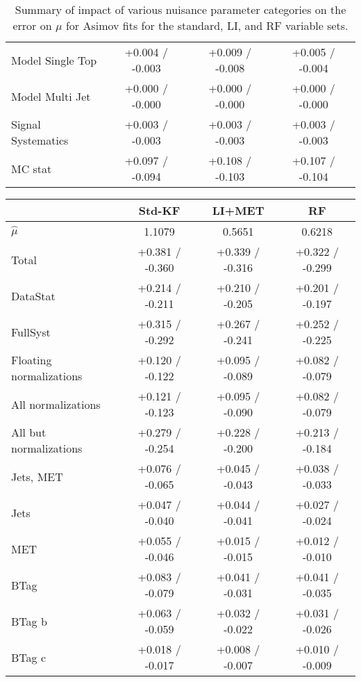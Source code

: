 \begin{table}[!htbp]
\begin{center}
\begin{tabular}{lccc}
Model Single Top &  +0.004 / -0.003  &  +0.009 / -0.008  &  +0.005 / -0.004 \\
Model Multi Jet &  +0.000 / -0.000  &  +0.000 / -0.000  &  +0.000 / -0.000 \\
Signal Systematics &  +0.003 / -0.003  &  +0.003 / -0.003  &  +0.003 / -0.003 \\
MC stat &  +0.097 / -0.094  &  +0.108 / -0.103  &  +0.107 / -0.104 \\
\hline\hline
\end{tabular}
\end{center}
\caption{Summary of impact of various nuisance parameter categories on the error on $\mu$ for Asimov fits for the standard, LI, and RF variable sets.}
\label{tab:asibdvz}
\end{table}

\begin{table}[!htbp]\captionsetup{justification=centering}
\begin{center}
\begin{tabular}{lccc}
\hline\hline
 &Std-KF &LI+MET &RF\\
\hline
$\hat{\mu}$ & 1.1079 & 0.5651 & 0.6218\\
\hline
Total &  +0.381 / -0.360  &  +0.339 / -0.316  &  +0.322 / -0.299 \\
\hline
DataStat &  +0.214 / -0.211  &  +0.210 / -0.205  &  +0.201 / -0.197 \\
FullSyst &  +0.315 / -0.292  &  +0.267 / -0.241  &  +0.252 / -0.225 \\
Floating normalizations &  +0.120 / -0.122  &  +0.095 / -0.089  &  +0.082 / -0.079 \\
All normalizations &  +0.121 / -0.123  &  +0.095 / -0.090  &  +0.082 / -0.079 \\
All but normalizations &  +0.279 / -0.254  &  +0.228 / -0.200  &  +0.213 / -0.184 \\
\hline
Jets, MET &  +0.076 / -0.065  &  +0.045 / -0.043  &  +0.038 / -0.033 \\
Jets &  +0.047 / -0.040  &  +0.044 / -0.041  &  +0.027 / -0.024 \\
MET &  +0.055 / -0.046  &  +0.015 / -0.015  &  +0.012 / -0.010 \\
BTag &  +0.083 / -0.079  &  +0.041 / -0.031  &  +0.041 / -0.035 \\
BTag b &  +0.063 / -0.059  &  +0.032 / -0.022  &  +0.031 / -0.026 \\
BTag c &  +0.018 / -0.017  &  +0.008 / -0.007  &  +0.010 / -0.009 \\

\end{tabular}
\end{center}
\end{table}

